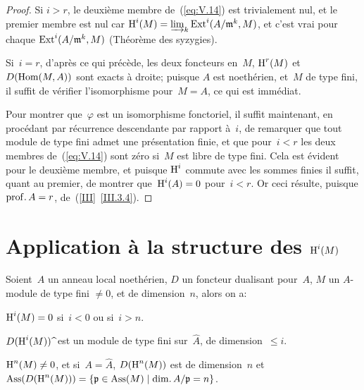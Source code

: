 \begin{proof}
Si $i>r$, le deuxi\`eme membre de~(\ref{eq:V.14}) est trivialement nul, et le premier membre est nul car $\operatorname{H}^{i}(M)=\varinjlim_{k}\operatorname{Ext}^{i}(A/\mathfrak{m}^{k}, M)$, et c'est vrai pour chaque $\operatorname{Ext}^{i}(A/\mathfrak{m}^{k}, M)$ (Th\'eor\`eme des syzygies).

Si~$i=r$, d'apr\`es ce qui pr\'ec\`ede, les deux foncteurs en~$M$, $\operatorname{H}^{r}(M)$ et~$D(\operatorname{Hom}(M, A))$ sont exacts \`a droite; puisque $A$ est noeth\'erien, et~$M$ de type fini, il suffit de v\'erifier l'isomorphisme pour~$M=A$, ce qui est imm\'ediat.

Pour montrer que~$\varphi$ est un isomorphisme fonctoriel, il suffit maintenant, en proc\'edant par r\'ecurrence descendante par rapport \`a~$i$, de remarquer que tout module de type fini admet une pr\'esentation finie, et que pour~$i<r$ les deux membres de~(\ref{eq:V.14}) sont z\'ero si~$M$ est libre de type fini. Cela est \'evident pour le deuxi\`eme membre, et puisque $\operatorname{H}^{i}$ commute avec les sommes finies il suffit, quant au premier, de montrer que~$\operatorname{H}^{i}(A)=0$ pour~$i<r$. Or ceci r\'esulte, puisque $\mathrm{prof}.\, A=r$, de~(\ref{III}~\ref{III.3.4}).
\skipqed
\end{proof}

\section{Application \`a la structure des $\operatorname{H}^i(M)$} \label{V.3}

\setcounter{equation}{14}

\begin{theoreme} \label{V.3.1} Soient~$A$ un anneau local noeth\'erien, $D$ un foncteur dualisant pour~$A$, $M$ un $A$-module de type fini $\neq 0$, et de dimension~$n$, alors on a:
\begin{enumeratei}
\item
$\operatorname{H}^{i}(M)=0$ si~$i<0$ ou si~$i>n$.
\item
$D(\operatorname{H}^{i}(M))\;\widehat{\hbox{}}$ est un module de type fini sur~$\widehat{A}$, de dimension~$\leq i$.
\item
$\operatorname{H}^{n}(M)\neq 0$, et si~$A=\widehat{A}$, $D(\operatorname{H}^{n}(M))$ est de dimension~$n$ et $\operatorname{Ass}(D(\operatorname{H}^{n}(M)))=\{ \mathfrak{p}\in\operatorname{Ass}(M) \mid \mathrm{dim}.\, A/\mathfrak{p}=n\}$.
\end{enumeratei}
\end{theoreme}

